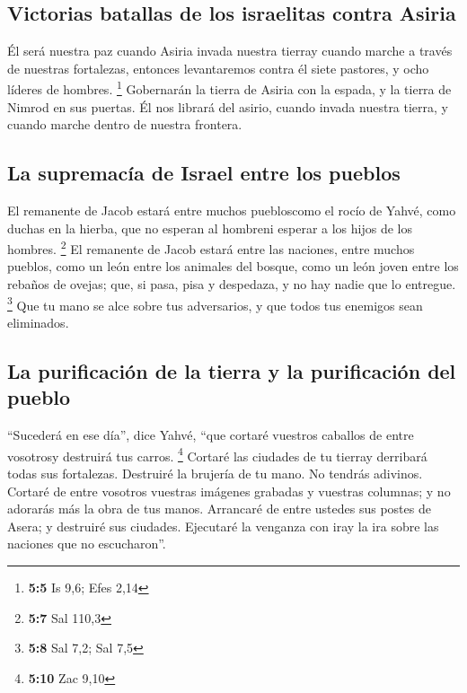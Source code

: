 \hypertarget{victorias-batallas-de-los-israelitas-contra-asiria}{%
\subsection{Victorias batallas de los israelitas contra
Asiria}\label{victorias-batallas-de-los-israelitas-contra-asiria}}

 Él será nuestra paz cuando Asiria invada nuestra tierray
cuando marche a través de nuestras fortalezas, entonces levantaremos
contra él siete pastores, y ocho líderes de hombres. \footnote{\textbf{5:5}
  Is 9,6; Efes 2,14}  Gobernarán la tierra de Asiria con
la espada, y la tierra de Nimrod en sus puertas. Él nos librará del
asirio, cuando invada nuestra tierra, y cuando marche dentro de nuestra
frontera.

\hypertarget{la-supremacuxeda-de-israel-entre-los-pueblos}{%
\subsection{La supremacía de Israel entre los
pueblos}\label{la-supremacuxeda-de-israel-entre-los-pueblos}}

 El remanente de Jacob estará entre muchos puebloscomo el
rocío de Yahvé, como duchas en la hierba, que no esperan al hombreni
esperar a los hijos de los hombres. \footnote{\textbf{5:7} Sal 110,3}
 El remanente de Jacob estará entre las naciones, entre
muchos pueblos, como un león entre los animales del bosque, como un león
joven entre los rebaños de ovejas; que, si pasa, pisa y despedaza, y no
hay nadie que lo entregue. \footnote{\textbf{5:8} Sal 7,2; Sal 7,5}
 Que tu mano se alce sobre tus adversarios, y que todos
tus enemigos sean eliminados.

\hypertarget{la-purificaciuxf3n-de-la-tierra-y-la-purificaciuxf3n-del-pueblo}{%
\subsection{La purificación de la tierra y la purificación del
pueblo}\label{la-purificaciuxf3n-de-la-tierra-y-la-purificaciuxf3n-del-pueblo}}

 ``Sucederá en ese día'', dice Yahvé, ``que cortaré
vuestros caballos de entre vosotrosy destruirá tus carros. \footnote{\textbf{5:10}
  Zac 9,10}  Cortaré las ciudades de tu tierray derribará
todas sus fortalezas.  Destruiré la brujería de tu mano.
No tendrás adivinos.  Cortaré de entre vosotros vuestras
imágenes grabadas y vuestras columnas; y no adorarás más la obra de tus
manos.  Arrancaré de entre ustedes sus postes de Asera; y
destruiré sus ciudades.  Ejecutaré la venganza con iray
la ira sobre las naciones que no escucharon''.

